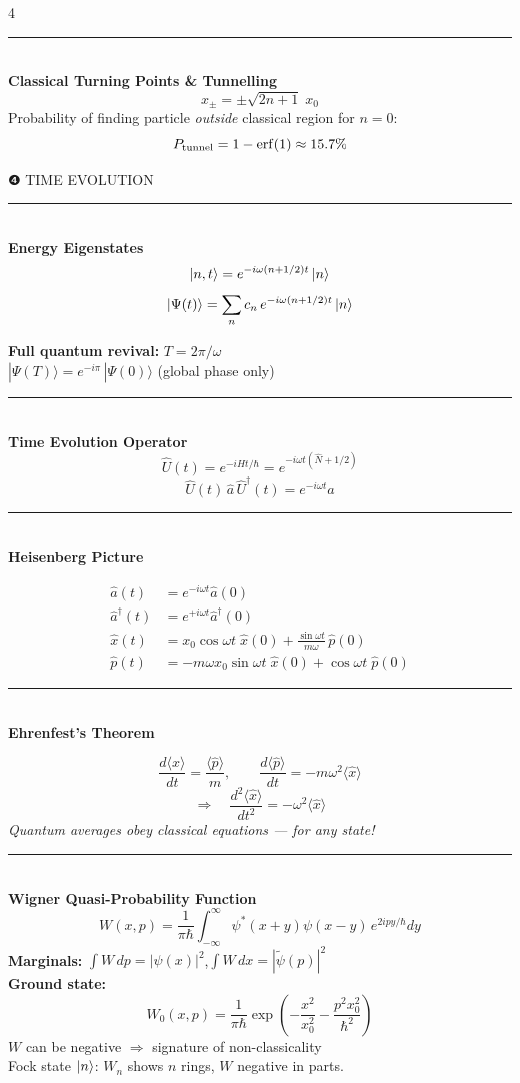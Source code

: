 \documentclass[9pt,landscape]{article}
\newcommand{\A}{\hat{a}}
\newcommand{\Ad}{\hat{a}^{\dagger}}
\newcommand{\N}{\hat{N}}
\newcommand{\x}{\hat{x}}
\newcommand{\p}{\hat{p}}
\newcommand{\H}{\hat{H}}
\newcommand{\xz}{x_0}                     %
\newcommand{\mysec}[1]{%
  \vspace{3pt}%
  {\color{midviolet}\rule{\linewidth}{0.6pt}}\\[-1pt]%
  {\bfseries\color{deepviolet}\small #1}\\[0.5pt]%
}
\begin{document}
\begin{multicols}{4}
\mysec{Classical Turning Points \& Tunnelling}
\[
  x_{\pm} = \pm\sqrt{2n+1}\;\xz
\]
Probability of finding particle \emph{outside} classical region for $n=0$:
\[
  P_{\rm tunnel} = 1-\operatorname{erf}(1)\approx 15.7\%
\]

\begin{tcolorbox}[sectionbox]
  \centering ❹\; TIME EVOLUTION
\end{tcolorbox}

\mysec{Energy Eigenstates}
\[
  \ket{n,t} = e^{-i\omega(n+1/2)t}\ket{n}
\]
\[
  \ket{\Psi(t)} = \sum_n c_n\,e^{-i\omega(n+1/2)t}\ket{n}
\]
\begin{tcolorbox}[goldbox]
\textbf{Full quantum revival:}\; $T = 2\pi/\omega$\\
$|\Psi(T)\rangle = e^{-i\pi}\,|\Psi(0)\rangle$ (global phase only)
\end{tcolorbox}

\mysec{Time Evolution Operator}
\[
  \hat{U}(t) = e^{-i\H t/\hbar} = e^{-i\omega t(\N+1/2)}
\]
\[
  \hat{U}(t)\,\A\,\hat{U}^\dagger(t) = e^{-i\omega t}\A
\]

\mysec{Heisenberg Picture}
\begin{tcolorbox}[keybox]
\begin{align*}
  \A(t) &= e^{-i\omega t}\A(0)\\
  \Ad(t) &= e^{+i\omega t}\Ad(0)\\
  \x(t) &= \xz\cos\omega t\;\x(0) + \frac{\sin\omega t}{m\omega}\,\p(0)\\
  \p(t) &= -m\omega\xz\sin\omega t\;\x(0) + \cos\omega t\;\p(0)
\end{align*}
\end{tcolorbox}

\mysec{Ehrenfest's Theorem}
\begin{tcolorbox}[greenbox]
\[
  \frac{d\langle\x\rangle}{dt}=\frac{\langle\p\rangle}{m},\qquad
  \frac{d\langle\p\rangle}{dt}=-m\omega^2\langle\x\rangle
\]
\[
  \Rightarrow\quad\frac{d^2\langle\x\rangle}{dt^2} = -\omega^2\langle\x\rangle
\]
\emph{Quantum averages obey classical equations — for any state!}
\end{tcolorbox}

\mysec{Wigner Quasi-Probability Function}
\[
  W(x,p) = \frac{1}{\pi\hbar}\!\int_{-\infty}^{\infty}\!\psi^*(x{+}y)\psi(x{-}y)\,e^{2ipy/\hbar}dy
\]
\textbf{Marginals:}\;
$\int W\,dp = |\psi(x)|^2$,\quad $\int W\,dx = |\tilde\psi(p)|^2$\\
\textbf{Ground state:}
\[
  W_0(x,p) = \frac{1}{\pi\hbar}\exp\!\left(-\frac{x^2}{\xz^2}-\frac{p^2\xz^2}{\hbar^2}\right)
\]
$W$ can be negative $\Rightarrow$ signature of non-classicality\\
Fock state $\ket{n}$: $W_n$ shows $n$ rings, $W$ negative in parts.


\end{multicols}
\end{document}
